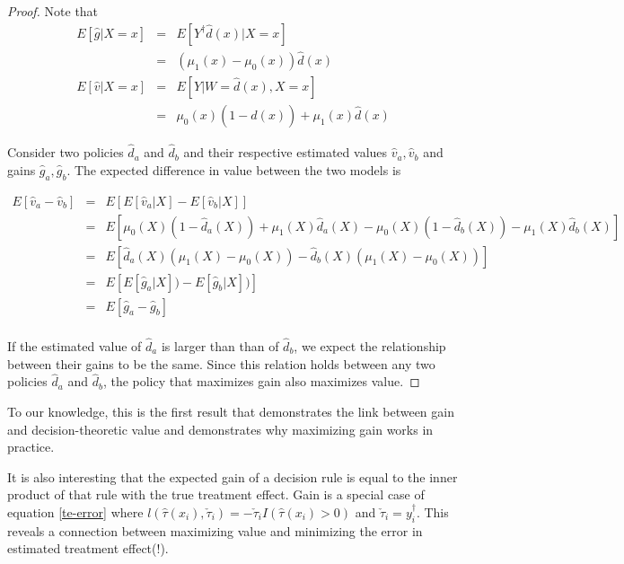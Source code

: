 \begin{proof}
Note that
\[
\begin{array}{rcl}	
	E[\hat g | X=x] & = & E[Y^{\dagger} \hat d(x) | X=x]  \\
	& =  & (\mu_1(x)-\mu_0(x))  \hat d(x)  \\
	E[\hat v | X=x] & = & E[Y | W=\hat d(x), X=x]  \\
	& = & \mu_0(x)(1-\hat d(x)) + \mu_1(x)\hat d(x)
\end{array}
\]

Consider two policies $\hat d_a$ and $\hat d_b$ and their respective estimated values $\hat v_a, \hat v_b$  and gains $\hat g_a, \hat g_b$. The expected difference in value between the two models is 

\[
\begin{array}{rcl}
E[\hat v_a - \hat v_b] 

& = & E[E[\hat v_a | X] - E[\hat v_b|X]] \\

&=& E \left[
	\mu_0(X)(1-\hat d_a(X)) + \mu_1(X)\hat d_a(X) 
      - \mu_0(X)(1-\hat d_b(X)) -  \mu_1(X)\hat d_b(X)
\right] \\

&=& E \left[
	  \hat d_a(X) (\mu_1(X)  - \mu_0(X) ) 
	- \hat d_b(X) (\mu_1(X)  - \mu_0(X) )
\right] \\

&=& E \left[
	  E[\hat g_a | X] ) 
	- E[\hat g_b | X] )
\right] \\

&=& E \left[ \hat g_a - \hat g_b \right] \\

\end{array}
\]

If the estimated value of $\hat d_a$ is larger than than of $\hat d_b$, we expect the relationship between their gains to be the same. Since this relation holds between any two policies $\hat d_a$ and $\hat d_b$, the policy that maximizes gain also maximizes value.

\end{proof}

To our knowledge, this is the first result that demonstrates the link between gain and decision-theoretic value and demonstrates why maximizing gain works in practice. 

It is also interesting that the expected gain of a decision rule is equal to the inner product of that rule with the true treatment effect. Gain is a special case of equation \ref{te-error} where $l(\hat \tau (x_i), \check \tau_i) = -\check \tau_i  I(\hat \tau (x_i) > 0)$ and $\check\tau_i = y_i^{\dagger}$. This reveals a connection between maximizing value and minimizing the error in estimated treatment effect(!). 

